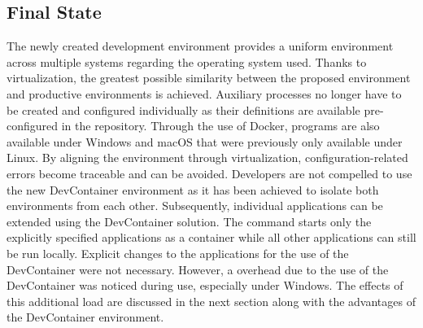        \subsection{Final State}\label{sec::final}
        The newly created development environment provides a uniform environment across multiple systems regarding the operating system used. Thanks to virtualization, the greatest possible similarity between the proposed environment and productive environments is achieved. Auxiliary processes no longer have to be created and configured individually as their definitions are available pre-configured in the repository. Through the use of Docker, programs are also available under Windows and macOS that were previously only available under Linux. By aligning the environment through virtualization, configuration-related errors become traceable and can be avoided. \newline
        Developers are not compelled to use the new DevContainer environment as it has been achieved to isolate both environments from each other. Subsequently, individual applications can be extended using the DevContainer solution. The command  starts only the explicitly specified applications as a container while all other applications can still be run locally. Explicit changes to the applications for the use of the DevContainer were not necessary.\newline
        However, a overhead due to the use of the DevContainer was noticed during use, especially under Windows. The effects of this additional load are discussed in the next section along with the advantages of the DevContainer environment.

